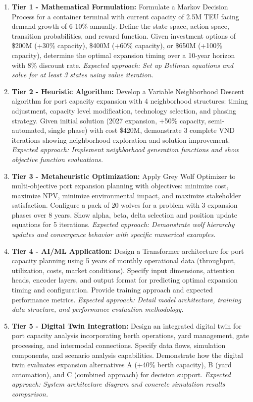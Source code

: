 \documentclass{article}
\begin{document}
\begin{enumerate}
\item \textbf{Tier 1 - Mathematical Formulation:} Formulate a Markov Decision Process for a container terminal with current capacity of 2.5M TEU facing demand growth of 6-10\% annually. Define the state space, action space, transition probabilities, and reward function. Given investment options of \$200M (+30\% capacity), \$400M (+60\% capacity), or \$650M (+100\% capacity), determine the optimal expansion timing over a 10-year horizon with 8\% discount rate. \textit{Expected approach: Set up Bellman equations and solve for at least 3 states using value iteration.}

\item \textbf{Tier 2 - Heuristic Algorithm:} Develop a Variable Neighborhood Descent algorithm for port capacity expansion with 4 neighborhood structures: timing adjustment, capacity level modification, technology selection, and phasing strategy. Given initial solution (2027 expansion, +50\% capacity, semi-automated, single phase) with cost \$420M, demonstrate 3 complete VND iterations showing neighborhood exploration and solution improvement. \textit{Expected approach: Implement neighborhood generation functions and show objective function evaluations.}

\item \textbf{Tier 3 - Metaheuristic Optimization:} Apply Grey Wolf Optimizer to multi-objective port expansion planning with objectives: minimize cost, maximize NPV, minimize environmental impact, and maximize stakeholder satisfaction. Configure a pack of 20 wolves for a problem with 3 expansion phases over 8 years. Show alpha, beta, delta selection and position update equations for 5 iterations. \textit{Expected approach: Demonstrate wolf hierarchy updates and convergence behavior with specific numerical examples.}

\item \textbf{Tier 4 - AI/ML Application:} Design a Transformer architecture for port capacity planning using 5 years of monthly operational data (throughput, utilization, costs, market conditions). Specify input dimensions, attention heads, encoder layers, and output format for predicting optimal expansion timing and configuration. Provide training approach and expected performance metrics. \textit{Expected approach: Detail model architecture, training data structure, and performance evaluation methodology.}

\item \textbf{Tier 5 - Digital Twin Integration:} Design an integrated digital twin for port capacity analysis incorporating berth operations, yard management, gate processing, and intermodal connections. Specify data flows, simulation components, and scenario analysis capabilities. Demonstrate how the digital twin evaluates expansion alternatives A (+40\% berth capacity), B (yard automation), and C (combined approach) for decision support. \textit{Expected approach: System architecture diagram and concrete simulation results comparison.}


\end{enumerate}
\end{document}

